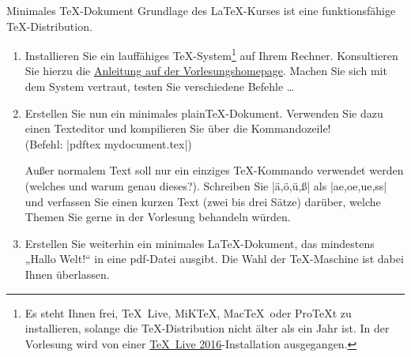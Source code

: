 \documentclass[
	blattnr=0,
	ausgabe=2016-10-21,
	abgabe=2016-10-28,
	shortverb,
]{../tex/latexkurs-exercise}
\begin{document}
\begin{abstract}
	\noindent Achtung: Da die Installation der \TeX-Distribution grundlegend für den Kurs ist,
	muss die Abgabe für dieses Blatt von jedem einzeln bearbeitet werden. \\
	\emph{Keine Gruppenabgabe!}
\end{abstract}

\begin{aufgabe}[12]{Minimales \TeX-Dokument}
	Grundlage des \LaTeX-Kurses ist eine funktionsfähige \TeX-Distribution. 
	\begin{enumerate}[label=\alph*)]
		\item Installieren Sie ein lauffähiges \TeX-System\footnote{ Es steht Ihnen frei, \TeX~Live, MiK\TeX, Mac\TeX~oder Pro\TeX t zu installieren, solange die \TeX-Distribution nicht älter als ein Jahr ist. In der Vorlesung wird von einer \href{http://www.tug.org/texlive/}{\TeX~Live 2016}-Installation ausgegangen.} auf Ihrem Rechner. Konsultieren Sie hierzu die \href{http://latexkurs.github.io/exercises/00_texlive_installation.pdf}{Anleitung auf der Vorlesungshomepage}. Machen Sie sich mit dem System vertraut, testen Sie verschiedene Befehle …

		\item \label{aufg:texdoc} Erstellen Sie nun ein minimales plain\TeX-Dokument. Verwenden Sie dazu einen Texteditor und kompilieren Sie über die Kommandozeile! \\(Befehl: |pdftex mydocument.tex|)

		Außer normalem Text soll nur ein einziges \TeX-Kommando verwendet werden (welches und warum genau dieses?). Schreiben Sie |ä,ö,ü,ß| als |ae,oe,ue,ss| und verfassen Sie einen kurzen Text (zwei bis drei Sätze) darüber, welche Themen Sie gerne in der Vorlesung behandeln würden.

		\item \label{aufg:latexdoc} Erstellen Sie weiterhin ein minimales \LaTeX-Dokument, das mindestens „Hallo Welt!“ in eine pdf-Datei ausgibt. Die Wahl der \TeX-Maschine ist dabei Ihnen überlassen.
	\end{enumerate}
\end{aufgabe}


\end{document}
